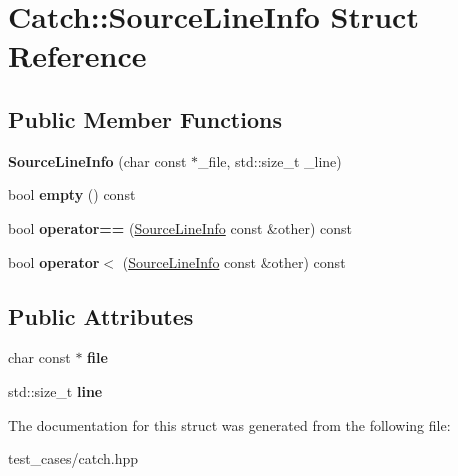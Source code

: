 \hypertarget{structCatch_1_1SourceLineInfo}{}\section{Catch\+:\+:Source\+Line\+Info Struct Reference}
\label{structCatch_1_1SourceLineInfo}
\subsection*{Public Member Functions}
\begin{DoxyCompactItemize}
\item 
\mbox{\label{structCatch_1_1SourceLineInfo_a6218cb890337d37f708ea94063958940}} 
{\bfseries Source\+Line\+Info} (char const $\ast$\+\_\+file, std\+::size\+\_\+t \+\_\+line)
\item 
\mbox{\label{structCatch_1_1SourceLineInfo_a05ab6444e9de7e9c3e76d8aa00093c3a}} 
bool {\bfseries empty} () const
\item 
\mbox{\label{structCatch_1_1SourceLineInfo_a688e761986879266658f000f14ab8a42}} 
bool {\bfseries operator==} (\hyperlink{structCatch_1_1SourceLineInfo}{Source\+Line\+Info} const \&other) const
\item 
\mbox{\label{structCatch_1_1SourceLineInfo_a8b99a0d7b1553d8c2298c694db924be3}} 
bool {\bfseries operator$<$} (\hyperlink{structCatch_1_1SourceLineInfo}{Source\+Line\+Info} const \&other) const
\end{DoxyCompactItemize}
\subsection*{Public Attributes}
\begin{DoxyCompactItemize}
\item 
\mbox{\label{structCatch_1_1SourceLineInfo_ad65537703e9f08c1fa7777fbc3f0c617}} 
char const  $\ast$ {\bfseries file}
\item 
\mbox{\label{structCatch_1_1SourceLineInfo_a841e5d696c7b9cde24e45e61dd979c77}} 
std\+::size\+\_\+t {\bfseries line}
\end{DoxyCompactItemize}


The documentation for this struct was generated from the following file\+:\begin{DoxyCompactItemize}
\item 
test\+\_\+cases/catch.\+hpp\end{DoxyCompactItemize}
